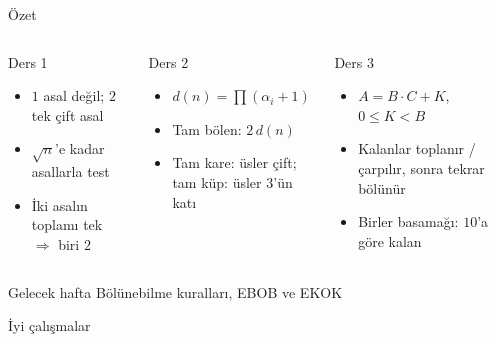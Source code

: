 \documentclass[aspectratio=169,11pt,handout]{beamer}
\begin{document}
\begin{frame}{Özet}
\begin{columns}[t]
\begin{block}{Ders 1}
\begin{itemize}
\item \(1\) asal değil; \(2\) tek çift asal
\item \(\sqrt{n}\)'e kadar asallarla test
\item İki asalın toplamı tek \(\Rightarrow\) biri \(2\)
\end{itemize}
\end{block}
\begin{block}{Ders 2}
\begin{itemize}
\item \(d(n)=\prod(\alpha_i+1)\)
\item Tam bölen: \(2\,d(n)\)
\item Tam kare: üsler çift; tam küp: üsler \(3\)'ün katı
\end{itemize}
\end{block}
\begin{block}{Ders 3}
\begin{itemize}
\item \(A=B\cdot C+K\), \(0\le K<B\)
\item Kalanlar toplanır / çarpılır, sonra tekrar bölünür
\item Birler basamağı: \(10\)'a göre kalan
\end{itemize}
\end{block}
\end{columns}
\vspace{6pt}
\begin{alertblock}{Gelecek hafta}
Bölünebilme kuralları, EBOB ve EKOK
\end{alertblock}
\end{frame}

\begin{frame}
\centering\Large İyi çalışmalar
\end{frame}
\end{document}
